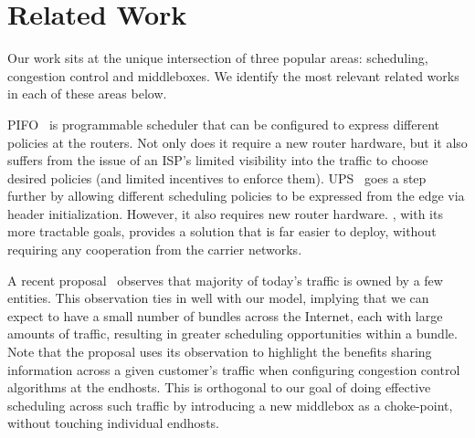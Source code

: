 \section{Related Work}
\label{s:related}

Our work sits at the unique intersection of three popular areas: scheduling, congestion control and middleboxes. We identify the most relevant related works in each of these areas below. 

 PIFO~\cite{pifo} is programmable scheduler that can be configured to express different policies at the routers. Not only does it require a new router hardware, but it also suffers from the issue of an ISP's limited visibility into the traffic to choose desired policies (and limited incentives to enforce them). UPS~\cite{ups} goes a step further by allowing different scheduling policies to be expressed from the edge via header initialization. 
However, it also requires new router hardware. \name, with its more tractable goals, provides a solution that is far easier to deploy, without requiring any cooperation from the carrier networks. 

 A recent proposal~\cite{fivecomps} observes that majority of today's traffic is owned by a few entities.
This observation ties in well with our model, implying that we can expect to have a small number of bundles across the Internet, each with large amounts of traffic, resulting in greater scheduling opportunities within a bundle. Note that the proposal uses its observation to highlight the benefits sharing information across a given customer's traffic when configuring congestion control algorithms at the endhosts. This is orthogonal to our goal of doing effective scheduling across such traffic by introducing a new middlebox as a choke-point, without touching individual endhosts. 

